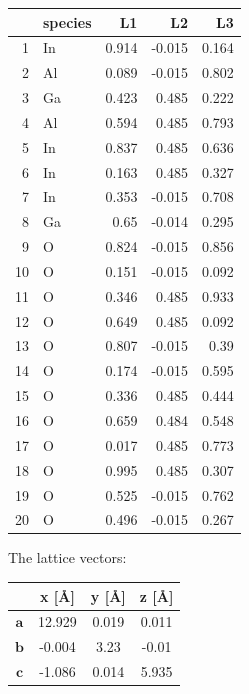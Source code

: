 \documentclass[11pt,oneside,czech,american]{book} %
\theoremstyle{definition} %
\theoremstyle{definition}
\begin{document}
\begin{table}[h]
\begin{tabular}{rlrrr}
	\end{tabular}
	\begin{tabular}{rlrrr}
		\hline
		& species   &    L1 &     L2 &    L3 \\
		\hline
		1 & In        & 0.914 & -0.015 & 0.164 \\
		2 & Al        & 0.089 & -0.015 & 0.802 \\
		3 & Ga        & 0.423 &  0.485 & 0.222 \\
		4 & Al        & 0.594 &  0.485 & 0.793 \\
		5 & In        & 0.837 &  0.485 & 0.636 \\
		6 & In        & 0.163 &  0.485 & 0.327 \\
		7 & In        & 0.353 & -0.015 & 0.708 \\
		8 & Ga        & 0.65  & -0.014 & 0.295 \\
		9 & O         & 0.824 & -0.015 & 0.856 \\
		10 & O         & 0.151 & -0.015 & 0.092 \\
		11 & O         & 0.346 &  0.485 & 0.933 \\
		12 & O         & 0.649 &  0.485 & 0.092 \\
		13 & O         & 0.807 & -0.015 & 0.39  \\
		14 & O         & 0.174 & -0.015 & 0.595 \\
		15 & O         & 0.336 &  0.485 & 0.444 \\
		16 & O         & 0.659 &  0.484 & 0.548 \\
		17 & O         & 0.017 &  0.485 & 0.773 \\
		18 & O         & 0.995 &  0.485 & 0.307 \\
		19 & O         & 0.525 & -0.015 & 0.762 \\
		20 & O         & 0.496 & -0.015 & 0.267 \\
		\hline
	\end{tabular}
\end{table}

The lattice vectors:
\begin{table}[h]
	\centering
	\begin{tabular}{cccc}
		\hline
		& x [\AA]&     y [\AA]&      z [\AA]\\
		\hline
		$\bm{a}$ & 12.929 & 0.019 &  0.011 \\
		$\bm{b}$ & -0.004 & 3.23  & -0.01  \\
		$\bm{c}$ & -1.086 & 0.014 &  5.935 \\
		\hline
	\end{tabular}
\end{table}
\end{document}
